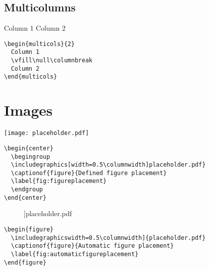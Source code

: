 \documentclass[a4paper,11pt,fleqn]{book}
\begin{document}
\begin{enumerate}
\section{Multicolumns}
\begin{multicols}{2}
  \begin{multicols}{2}
    Column 1
    \vfill\null\columnbreak
    Column 2
  \end{multicols}

  \vfill\null\columnbreak

  \begin{verbatim}
\begin{multicols}{2}
  Column 1
  \vfill\null\columnbreak
  Column 2
\end{multicols}
  \end{verbatim}
\end{multicols}

\chapter{Images}
\minitoc\newpage

\begin{multicols}{2}
  \begin{center}
    \begingroup
    \texttt{[image: placeholder.pdf]}
    \label{fig:figureplacement}
    \endgroup
  \end{center}

  \vfill\null\columnbreak

  \begin{verbatim}
\begin{center}
  \begingroup
  \includegraphics[width=0.5\columnwidth]placeholder.pdf}
  \captionof{figure}{Defined figure placement}
  \label{fig:figureplacement}
  \endgroup
\end{center}
  \end{verbatim}
\end{multicols}

\begin{multicols}{2}
  \begin{figure}
    \columnwidth]{placeholder.pdf}
    \label{fig:automaticfigureplacement}
  \end{figure}

  \vfill\null\columnbreak
  \begin{verbatim}
\begin{figure}
  \includegraphicswidth=0.5\columnwidth]{placeholder.pdf}
  \captionof{figure}{Automatic figure placement}
  \label{fig:automaticfigureplacement}
\end{figure}
  \end{verbatim}
\end{multicols}


\end{enumerate}
\end{document}
